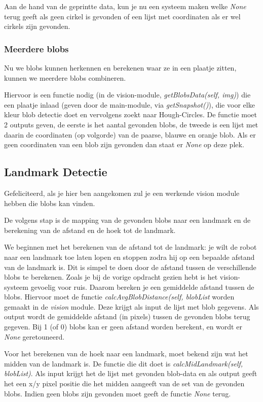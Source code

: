 \documentclass[a4paper]{article}
\begin{document}
Aan de hand van de geprintte data, kun je nu een systeem maken welke \textit{None} terug geeft als geen cirkel is gevonden of een lijst met coordinaten als er wel cirkels zijn gevonden.

\subsubsection{Meerdere blobs}
Nu we blobs kunnen herkennen en berekenen waar ze in een plaatje zitten, kunnen we meerdere blobs combineren.

Hiervoor is een functie nodig (in de vision-module, \textit{getBlobsData(self, img)}) die een plaatje inlaad (geven door de main-module, via \textit{getSnapshot()}), die voor elke kleur blob detectie doet en vervolgens zoekt  naar Hough-Circles. De functie moet 2 outputs geven, de eerste is het aantal gevonden blobs, de tweede is een lijst met daarin de coordinaten (op volgorde) van de paarse, blauwe en oranje blob. Als er geen coordinaten van een blob zijn gevonden dan staat er \textit{None} op deze plek. 

\subsection{Landmark Detectie}
Gefeliciteerd, als je hier ben aangekomen zul je een werkende vision module hebben die blobs kan vinden.

De volgens stap is de mapping van de gevonden blobs naar een landmark en de berekening van de afstand en de hoek tot de landmark.

We beginnen met het berekenen van de afstand tot de landmark: je wilt de robot naar een landmark toe laten lopen en stoppen zodra hij op een bepaalde afstand van de landmark is. Dit is simpel te doen door de afstand tussen de verschillende blobs te berekenen. Zoals je bij de vorige opdracht gezien hebt is het vision-systeem gevoelig voor ruis. Daarom bereken je een gemiddelde afstand tussen de blobs. Hiervoor moet de functie \textit{calcAvgBlobDistance(self, blobList} worden gemaakt in de \textit{vision} module. Deze krijgt als input de lijst met blob gegevens. Als output wordt de gemiddelde afstand (in pixels) tussen de gevonden blobs terug gegeven. Bij 1 (of 0) blobs kan er geen afstand worden berekent, en wordt er \textit{None} geretouneerd.

Voor het berekenen van de hoek naar een landmark, moet bekend zijn wat het midden van de landmark is. De functie die dit doet is \textit{calcMidLandmark(self, blobList)}. Als input krijgt het de lijst met gevonden blob-data en als output geeft het een x/y pixel positie die het midden aangeeft van de set van de gevonden blobs. Indien geen blobs zijn gevonden moet geeft de functie \textit{None} terug.
\end{document}

